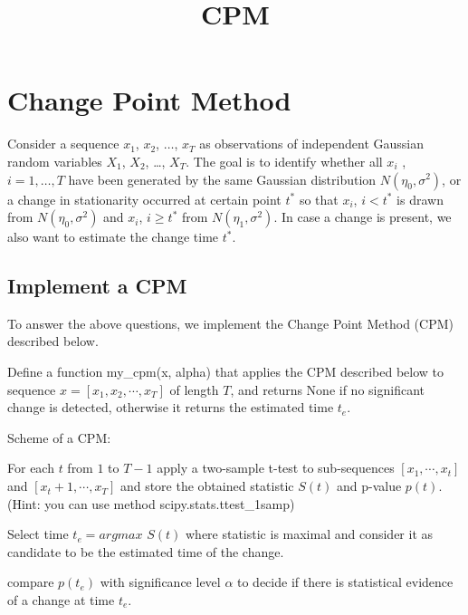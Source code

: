 \documentclass[11pt]{article}
\title{CPM}
\begin{document}
    
    
    \maketitle
    
    

    
    \hypertarget{change-point-method}{%
\section{Change Point Method}\label{change-point-method}}

Consider a sequence \(x_1\), \(x_2\), \(\ldots\), \(x_T\) as
observations of independent Gaussian random variables \(X_1\), \(X_2\),
\ldots{}, \(X_T\). The goal is to identify whether all \(x_i\) ,
\(i=1,\ldots,T\) have been generated by the same Gaussian distribution
\(N(\eta_0,\sigma^2)\), or a change in stationarity occurred at certain
point \(t^\ast\) so that \(x_i\), \(i < t^\ast\) is drawn from
\(N(\eta_0,\sigma^2)\) and \(x_i\), \(i≥t^\ast\) from
\(N(\eta_1,\sigma^2)\). In case a change is present, we also want to
estimate the change time \(t^\ast\).

    \hypertarget{implement-a-cpm}{%
\subsection{Implement a CPM}\label{implement-a-cpm}}

To answer the above questions, we implement the Change Point Method
(CPM) described below.

Define a function my\_cpm(x, alpha) that applies the CPM described below
to sequence \(x=[x_1, x_2, \cdots, x_T]\) of length \(T\), and returns
None if no significant change is detected, otherwise it returns the
estimated time \(t_e\).

Scheme of a CPM:

For each \(t\) from \(1\) to \(T-1\) apply a two-sample t-test to
sub-sequences \([x_1, \cdots, x_t]\) and \([x_t+1, \cdots, x_T]\) and
store the obtained statistic \(S(t)\) and p-value \(p(t)\). (Hint: you
can use method scipy.stats.ttest\_1samp)

Select time \(t_e=argmax\) \(S(t)\) where statistic is maximal and
consider it as candidate to be the estimated time of the change.

compare \(p(t_e)\) with significance level \(\alpha\) to decide if there
is statistical evidence of a change at time \(t_e\).
\end{document}
